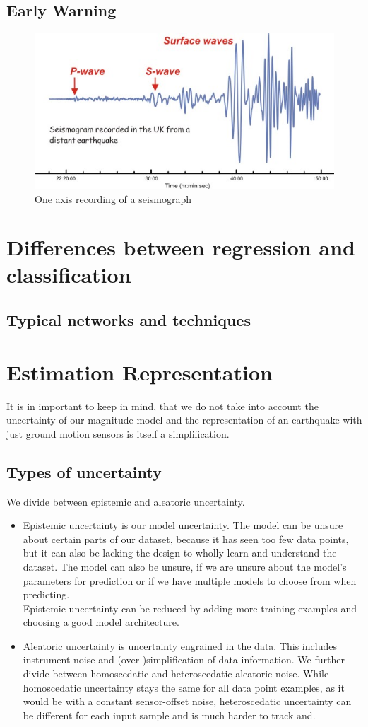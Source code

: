 \documentclass[thesis.tex]{subfiles}
\begin{document}
\subsection{Early Warning}
\begin{figure}[hb]
	\centering
	\includegraphics[width=0.6\linewidth]{../pictures/Prerequisites/dia_seismogram.jpg}
	\caption{One axis recording of a seismograph}
	\label{fig:seismogram}
\end{figure}
\section{Differences between regression and classification}
\subsection{Typical networks and techniques}
\section{Estimation Representation} 
 It is in important to keep in mind, that we do not take into account the uncertainty of our magnitude model and the representation of an earthquake with just ground motion sensors is itself a simplification.
\subsection{Types of uncertainty}
We divide between epistemic and aleatoric uncertainty.
\begin{itemize}
	\item Epistemic uncertainty is our model uncertainty. The model can be unsure about certain parts of our dataset, because it has seen too few data points, but it can also be lacking the design to wholly learn and understand the dataset. The model can also be unsure, if we are unsure about the model's parameters for prediction or if we have multiple models to choose from when predicting. 
	\\
	Epistemic uncertainty can be reduced by adding more training examples and choosing a good model architecture.
	\item Aleatoric uncertainty is uncertainty engrained in the data. This includes instrument noise and (over-)simplification of data information. We further divide between homoscedatic and heteroscedatic aleatoric noise. While homoscedatic uncertainty stays the same for all data point examples, as it would be with a constant sensor-offset noise, heteroscedatic uncertainty can be different for each input sample and is much harder to track and.
\end{itemize}
\end{document}
